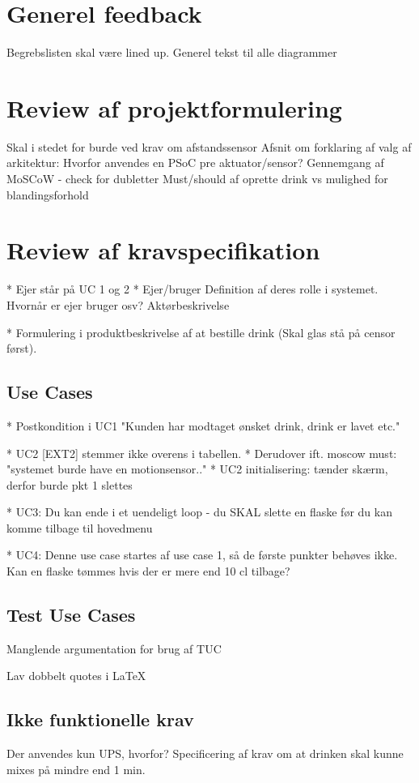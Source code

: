 \section{Generel feedback}
Begrebslisten skal være lined up.
Generel tekst til alle diagrammer

\section{Review af projektformulering}
Skal i stedet for burde ved krav om afstandssensor
Afsnit om forklaring af valg af arkitektur: Hvorfor anvendes en PSoC pre aktuator/sensor?
Gennemgang af MoSCoW - check for dubletter
Must/should af oprette drink vs mulighed for blandingsforhold

\section{Review af kravspecifikation}
* Ejer står på UC 1 og 2
* Ejer/bruger Definition af deres rolle i systemet. Hvornår er ejer bruger osv?
Aktørbeskrivelse

* Formulering i produktbeskrivelse af at bestille drink (Skal glas stå på censor først).

\subsection{Use Cases}

* Postkondition i UC1 "Kunden har modtaget ønsket drink, drink er lavet etc."

* UC2 [EXT2] stemmer ikke overens i tabellen.
* Derudover ift. moscow must: "systemet burde have en motionsensor.."
* UC2 initialisering: tænder skærm, derfor burde pkt 1 slettes


* UC3: Du kan ende i et uendeligt loop - du SKAL slette en flaske før du kan komme tilbage til hovedmenu

* UC4: Denne use case startes af use case 1, så de første punkter behøves ikke.
Kan en flaske tømmes hvis der er mere end 10 cl tilbage? 

\subsection{Test Use Cases}

Manglende argumentation for brug af TUC

Lav dobbelt quotes i LaTeX

\subsection{Ikke funktionelle krav}
Der anvendes kun UPS, hvorfor?
Specificering af krav om at drinken skal kunne mixes på mindre end 1 min.

